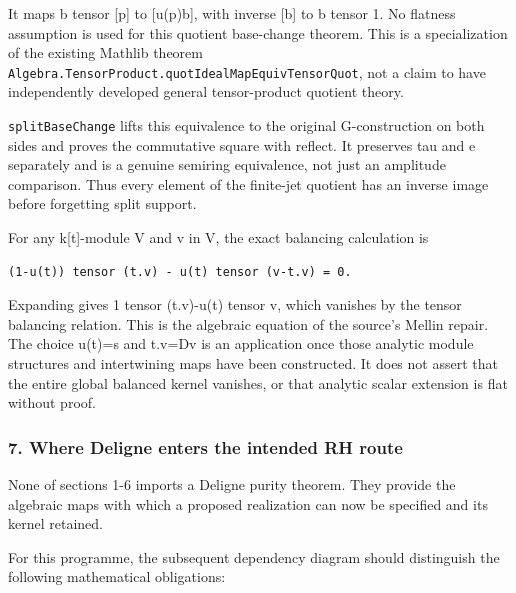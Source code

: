 It maps b tensor {[}p{]} to {[}u(p)b{]}, with inverse {[}b{]} to b tensor 1. No flatness assumption
is used for this quotient base-change theorem. This is a specialization of the existing Mathlib
theorem \nolinkurl{Algebra.TensorProduct.quotIdealMapEquivTensorQuot}, not a claim to have
independently developed general tensor-product quotient theory.

\nolinkurl{splitBaseChange} lifts this equivalence to the original G-construction on both sides and
proves the commutative square with reflect. It preserves tau and e separately and is a genuine
semiring equivalence, not just an amplitude comparison. Thus every element of the finite-jet
quotient has an inverse image before forgetting split support.

For any k{[}t{]}-module V and v in V, the exact balancing calculation is

\begin{verbatim}
(1-u(t)) tensor (t.v) - u(t) tensor (v-t.v) = 0.
\end{verbatim}

Expanding gives 1 tensor (t.v)-u(t) tensor v, which vanishes by the tensor balancing relation. This
is the algebraic equation of the source's Mellin repair. The choice u(t)=s and t.v=Dv is an
application once those analytic module structures and intertwining maps have been constructed. It
does not assert that the entire global balanced kernel vanishes, or that analytic scalar extension
is flat without proof.

\subsubsection{7. Where Deligne enters the intended RH
route}\label{derived_main:where-deligne-enters-the-intended-rh-route}

None of sections 1-6 imports a Deligne purity theorem. They provide the algebraic maps with which a
proposed realization can now be specified and its kernel retained.

For this programme, the subsequent dependency diagram should distinguish the following mathematical
obligations:

